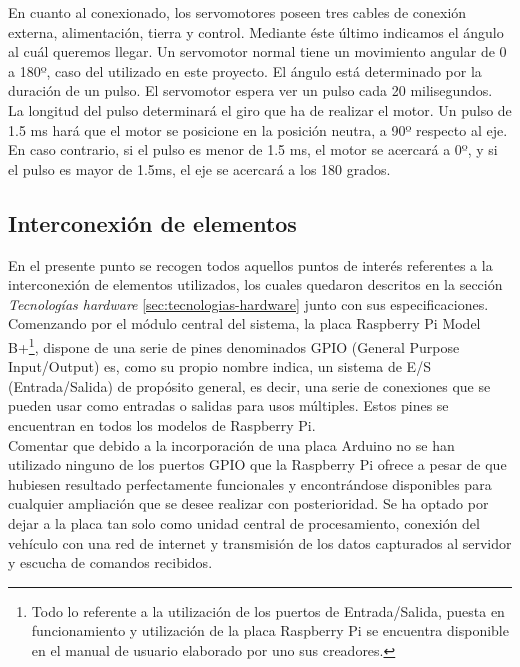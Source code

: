 En cuanto al conexionado, los servomotores poseen tres cables de conexión externa, alimentación, tierra y control. Mediante éste último indicamos el ángulo al cuál queremos llegar. 
Un servomotor normal tiene un movimiento angular de 0 a 180º, caso del utilizado en este proyecto. El ángulo está determinado por la duración de un pulso. El servomotor 
espera ver un pulso cada 20 milisegundos. La longitud del pulso determinará el giro que ha de realizar el motor. Un pulso de 1.5 ms hará que el motor se posicione en la posición 
neutra, a 90º respecto al eje. En caso contrario, si el pulso es menor de 1.5 ms,  el motor se acercará a 0º, y si el pulso es mayor de 1.5ms, el eje se acercará a los 180 grados.\\

\subsection{Interconexión de elementos}

En el presente punto se recogen todos aquellos puntos de interés referentes a la interconexión de elementos utilizados, los cuales quedaron descritos en la sección \emph{Tecnologías hardware}
\ref{sec:tecnologias-hardware} junto con sus especificaciones.\\

Comenzando por el módulo central del sistema, la placa Raspberry Pi Model B+\footnote{ Todo lo referente a la utilización de los puertos de Entrada/Salida, puesta en funcionamiento y
utilización de la placa Raspberry Pi se encuentra disponible en el manual de usuario \cite{book:Raspberry} elaborado por uno sus creadores. }, dispone de una serie de pines denominados GPIO (General Purpose Input/Output) es, como su propio nombre indica, 
un sistema de E/S (Entrada/Salida) de propósito general, es decir, una serie de conexiones que se pueden usar como entradas o salidas para usos múltiples. Estos pines se encuentran en todos
los modelos de Raspberry Pi.\\

Comentar que debido a la incorporación de una placa Arduino no se han utilizado ninguno de los puertos GPIO que la Raspberry Pi ofrece a pesar de que hubiesen resultado perfectamente 
funcionales y encontrándose disponibles para cualquier ampliación que se desee realizar con posterioridad. Se ha optado por dejar a la placa tan solo como unidad central de 
procesamiento, conexión del vehículo con una red de internet y transmisión de los datos capturados al servidor y escucha de comandos recibidos.\\

